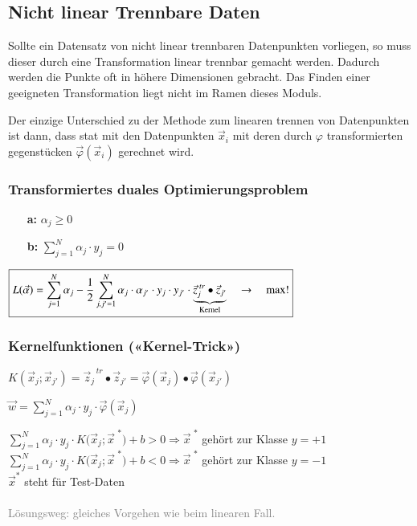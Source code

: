 \subsection{Nicht linear Trennbare Daten}
Sollte ein Datensatz von nicht linear trennbaren Datenpunkten vorliegen, so muss dieser durch eine Transformation linear trennbar gemacht werden.
Dadurch werden die Punkte oft in höhere Dimensionen gebracht.
Das Finden einer geeigneten Transformation liegt nicht im Ramen dieses Moduls.

Der einzige Unterschied zu der Methode zum linearen trennen von Datenpunkten ist dann, dass stat mit den Datenpunkten $\vec{x}_i$ mit deren durch $\varphi$ transformierten gegenstücken $\vec{\varphi}(\vec{x}_i)$ gerechnet wird.\\

\subsubsection{Transformiertes duales Optimierungsproblem}
    \begin{itemize}
        \item [\textbf{a:}] $\boxed{\alpha_j\geq0}$
        \item [\textbf{b:}] $\boxed{\sum_{j=1}^N\alpha_j \cdot y_j=0}$
    \end{itemize}
$\boxed{L(\vec{\alpha})=\sum_{j=1}^N\alpha_j-\frac{1}{2}\sum_{j,j'=1}^N\alpha_j \cdot \alpha_{j'} \cdot \space y_j \cdot y_{j'} \cdot \space \underbrace{\vec{z}_j^{\text{ $tr$}} \bullet  \vec{z}_{j'}}_{\text{Kernel}} \quad\to\quad\max!}$

\subsubsection{Kernelfunktionen («Kernel-Trick»)}
$\boxed{K\left( \vec{x}_j ; \vec{x}_{j'}\right) = \vec{z}_j^{\text{ $tr$}}\bullet\vec{z}_{j'}=\vec{\varphi}(\vec{x}_j) \bullet \vec{\varphi}(\vec{x}_{j'})}$

$\boxed{\vec{w}=\sum_{j=1}^N\alpha_j \cdot y_j \cdot \vec{\varphi}(\vec{x}_j)}$

$\boxed{\sum_{j=1}^N\alpha_j \cdot y_j \cdot K\Big(\vec{x}_j;\vec{x}^{\text{ *}} \Big)+b>0\Longrightarrow\vec{x}^{\text{ *}}}$ gehört zur Klasse $y = +1$\\
$\boxed{\sum_{j=1}^N\alpha_j \cdot y_j \cdot K\Big(\vec{x}_j;\vec{x}^{\text{ *}} \Big)+b<0\Longrightarrow\vec{x}^{\text{ *}}}$ gehört zur Klasse $y = -1$\\
$\vec{x}^*$ steht für Test-Daten\\\\
\textcolor{gray}{Lösungsweg: gleiches Vorgehen wie beim linearen Fall.}